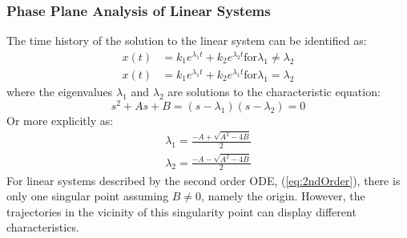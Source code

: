\documentclass[11pt,handout]{beamer}   %
\begin{document}
\begin{frame}
\frametitle{Phase Plane Analysis of Linear Systems}
\small
The time history of the solution to the linear system can be identified as:
\begin{eqnarray}
x(t) &= k_1 e^{\lambda_1 t} + k_2 e^{\lambda_2 t} \text{for} \lambda_1 \neq \lambda_2\\
x(t) &= k_1 e^{\lambda_1 t} + k_2 e^{\lambda_1 t} \text{for} \lambda_1 = \lambda_2
\end{eqnarray}
where the eigenvalues $\lambda_1$ and $\lambda_2$ are solutions to the characteristic equation:
\begin{equation}
s^2 + As+B = (s-\lambda_1)(s-\lambda_2) = 0
\end{equation}
Or more explicitly as:
\begin{eqnarray}
\lambda_1 = \frac{-A + \sqrt{A^2 - 4B}}{2}\\
\lambda_2 = \frac{-A - \sqrt{A^2 - 4B}}{2}
\end{eqnarray}
For linear systems described by the second order ODE, (\ref{eq:2ndOrder}), there is only one singular point assuming $B\neq0$, namely the origin. However, the trajectories in the vicinity of this singularity point can display different characteristics.
\end{frame}
\end{document}
